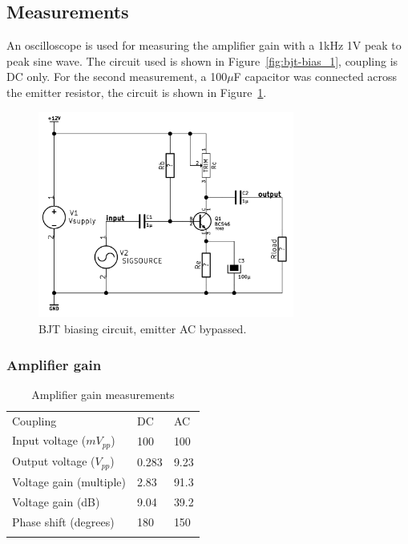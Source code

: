 \documentclass[11pt,a4paper]{article}
\begin{document}
\subsection{Measurements}\label{bjt-measurements}
An oscilloscope is used for measuring the amplifier gain with a 1kHz 1V peak to
peak sine wave. The circuit used is shown in Figure~\ref{fig:bjt-bias_1}, 
coupling is DC only. For the second measurement, a 100$\mu$F capacitor was connected
across the emitter resistor, the circuit is shown in Figure~\ref{fig:bjt-bias_2AC}.

\begin{figure}[htbp]
    \centering
    \includegraphics[width=0.75\textwidth]{img/bjt-bias_2AC.png}
    \caption{BJT biasing circuit, emitter AC bypassed.}
    \label{fig:bjt-bias_2AC}
\end{figure}

\subsubsection{Amplifier gain}\label{amplifier-gain}
\begin{longtable}[c]{lll}
\toprule\addlinespace
Coupling & DC & AC
\\\addlinespace
\midrule\endhead
Input voltage ($mV_{pp}$) & 100 & 100
\\\addlinespace
Output voltage ($V_{pp}$) & 0.283 & 9.23
\\\addlinespace
Voltage gain (multiple) & 2.83 & 91.3
\\\addlinespace
Voltage gain (dB) & 9.04 & 39.2
\\\addlinespace
Phase shift (degrees) & 180 & 150
\\\addlinespace
\bottomrule
\addlinespace
\caption{Amplifier gain measurements}
\end{longtable}
\end{document}
